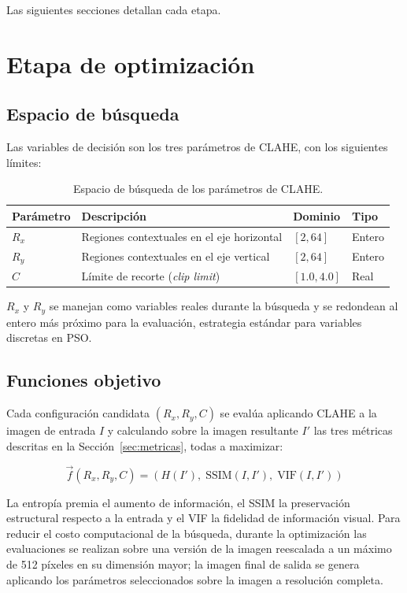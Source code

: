 Las siguientes secciones detallan cada etapa.

\section{Etapa de optimización}

\subsection{Espacio de búsqueda}

Las variables de decisión son los tres parámetros de CLAHE, con los siguientes límites:

\begin{table}[H]
\centering
\caption{Espacio de búsqueda de los parámetros de CLAHE.}
\label{tab:espacio_busqueda}
\begin{tabular}{llll}
\hline
\textbf{Parámetro} & \textbf{Descripción} & \textbf{Dominio} & \textbf{Tipo} \\
\hline
$R_x$ & Regiones contextuales en el eje horizontal & $[2, 64]$ & Entero \\
$R_y$ & Regiones contextuales en el eje vertical & $[2, 64]$ & Entero \\
$C$ & Límite de recorte (\textit{clip limit}) & $[1.0, 4.0]$ & Real \\
\hline
\end{tabular}
\end{table}

$R_x$ y $R_y$ se manejan como variables reales durante la búsqueda y se redondean al entero más próximo para la evaluación, estrategia estándar para variables discretas en PSO.

\subsection{Funciones objetivo}

Cada configuración candidata $(R_x, R_y, C)$ se evalúa aplicando CLAHE a la imagen de entrada $I$ y calculando sobre la imagen resultante $I'$ las tres métricas descritas en la Sección~\ref{sec:metricas}, todas a maximizar:

\begin{equation}
\vec{f}(R_x, R_y, C) = \left( H(I'), \; \text{SSIM}(I, I'), \; \text{VIF}(I, I') \right)
\label{eq:funciones_objetivo}
\end{equation}

La entropía premia el aumento de información, el SSIM la preservación estructural respecto a la entrada y el VIF la fidelidad de información visual. Para reducir el costo computacional de la búsqueda, durante la optimización las evaluaciones se realizan sobre una versión de la imagen reescalada a un máximo de 512 píxeles en su dimensión mayor; la imagen final de salida se genera aplicando los parámetros seleccionados sobre la imagen a resolución completa.

